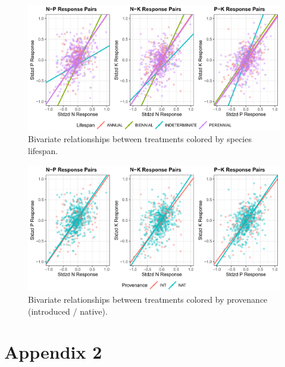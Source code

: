 \documentclass[twoside,12pt,final]{ucthesis-CA2012}
\begin{document}
\begin{ucmainmatter}
\begin{table}[ht]
\end{table}
\begin{figure}
\centering
\includegraphics[width=\textwidth,height=0.4\textheight]{figure/AppFig1_1.png}
\caption{Bivariate relationships between treatments colored by species lifespan. \label{app-1-1}}
\end{figure}
\begin{figure}
\centering
\includegraphics[width=\textwidth,height=0.4\textheight]{figure/AppFig1_2.png}
\caption{Bivariate relationships between treatments colored by provenance (introduced / native). \label{app-1-2}}
\end{figure}
\hypertarget{appendix-2}{%
\chapter{Appendix 2}\label{appendix-2}}

\hypertarget{appendix-3}{%
}
\end{ucmainmatter}
\end{document}
